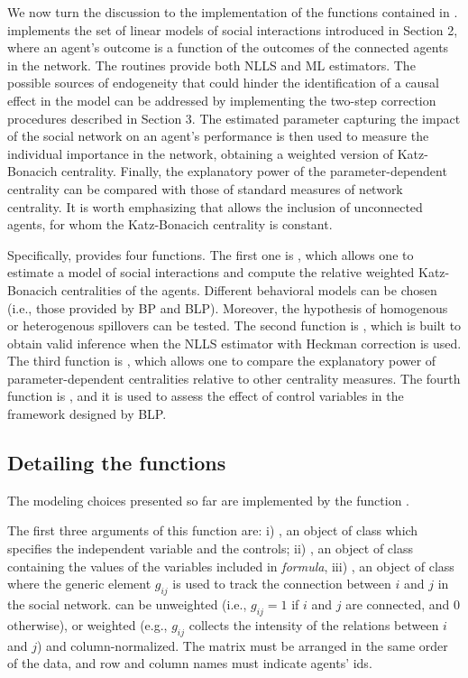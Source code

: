 \documentclass[nojss]{jss}
\begin{document}
We now turn the discussion to the implementation of the functions contained in .  implements the set of linear models of social interactions introduced in Section 2, where an agent's outcome is a function of the outcomes of the connected agents in the network. The routines provide both NLLS and ML estimators. The possible sources of endogeneity that could hinder the identification of a causal effect in the model can be addressed by implementing the two-step
correction procedures described in Section 3. The estimated parameter capturing the impact of the social network on an agent's performance is then used to measure the individual importance in the network, obtaining a weighted version of Katz-Bonacich centrality. Finally, the explanatory power of the parameter-dependent centrality can be compared with those of standard measures of network centrality. It is worth emphasizing that  allows the inclusion of unconnected agents, for whom the Katz-Bonacich centrality is constant.

Specifically,  provides four functions. The first one is , which allows one to estimate a model of social interactions and compute the relative weighted Katz-Bonacich centralities of the agents. Different behavioral models can be chosen (i.e., those provided by BP and BLP). Moreover, the hypothesis of homogenous or heterogenous spillovers can be tested. The second function is , which is built to obtain valid inference when the NLLS estimator with Heckman correction is used. The third function is , which allows one to compare the explanatory power of parameter-dependent centralities relative to other centrality measures. The fourth function is , and it is used to assess the effect of control variables in the framework designed by BLP.

\subsection{Detailing the functions}
The modeling choices presented so far are implemented by the function .

The first three arguments of this function are: i) , an object of class  which specifies the independent variable and the controls; ii) , an object of class  containing the values of the variables included in \textit{formula}, iii) , an object of class  where the generic element $g_{ij}$ is used to track the connection between $i$ and $j$ in the social network.  can be unweighted (i.e., $g_{ij}=1$ if $i$ and $j$ are connected, and 0 otherwise), or weighted (e.g., $g_{ij}$ collects the intensity of the relations between $i$ and $j$) and column-normalized. The matrix must be arranged in the same order of the data, and row and column names must indicate agents' ids.
\end{document}
